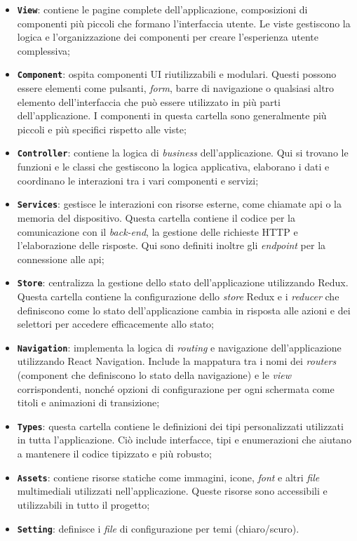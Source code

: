 \begin{itemize}
      \item \textbf{\texttt{View}}: contiene le pagine complete dell'applicazione, composizioni di 
            componenti più piccoli che formano l'interfaccia utente. Le viste gestiscono la logica e 
            l'organizzazione dei componenti per creare l'esperienza utente complessiva;
      \item \textbf{\texttt{Component}}: ospita componenti UI riutilizzabili e modulari. Questi possono 
            essere elementi come pulsanti, \textit{form}, barre di navigazione o qualsiasi altro elemento 
            dell'interfaccia che può essere utilizzato in più parti dell'applicazione. I componenti in 
            questa cartella sono generalmente più piccoli e più specifici rispetto alle viste;
      \item \textbf{\texttt{Controller}}: contiene la logica di \textit{business} dell'applicazione. Qui 
            si trovano le funzioni e le classi che gestiscono la logica applicativa, elaborano i dati e coordinano le 
            interazioni tra i vari componenti e servizi;
      \item \textbf{\texttt{Services}}: gestisce le interazioni con risorse esterne, come chiamate \gls{api} o la memoria
            del dispositivo. Questa cartella contiene il codice per la comunicazione con il \textit{back-end}, la gestione delle 
            richieste HTTP e l'elaborazione delle risposte. Qui sono definiti inoltre gli \textit{endpoint} per la connessione 
            alle \gls{api};
      \item \textbf{\texttt{Store}}: centralizza la gestione dello stato dell'applicazione utilizzando Redux. Questa cartella 
            contiene la configurazione dello \textit{store} Redux e i \textit{reducer} che definiscono come lo stato dell'applicazione 
            cambia in risposta alle azioni e  dei selettori per accedere efficacemente allo stato;
      \item \textbf{\texttt{Navigation}}: implementa la logica di \textit{routing} e navigazione dell'applicazione utilizzando 
            React Navigation. Include la mappatura tra i nomi dei \textit{routers} (component che definiscono lo stato della navigazione) 
            e le \textit{view} corrispondenti, nonché opzioni di configurazione per ogni schermata come titoli e animazioni di transizione;
      \item \textbf{\texttt{Types}}: questa cartella contiene le definizioni dei tipi personalizzati utilizzati in tutta l'applicazione. 
            Ciò include interfacce, tipi e enumerazioni che aiutano a mantenere il codice tipizzato e più robusto;
      \item \textbf{\texttt{Assets}}: contiene risorse statiche come immagini, icone, \textit{font} e altri \textit{file} multimediali 
            utilizzati nell'applicazione. Queste risorse sono accessibili e utilizzabili in tutto il progetto;
      \item \textbf{\texttt{Setting}}: definisce i \textit{file} di configurazione per temi (chiaro/scuro).
\end{itemize}